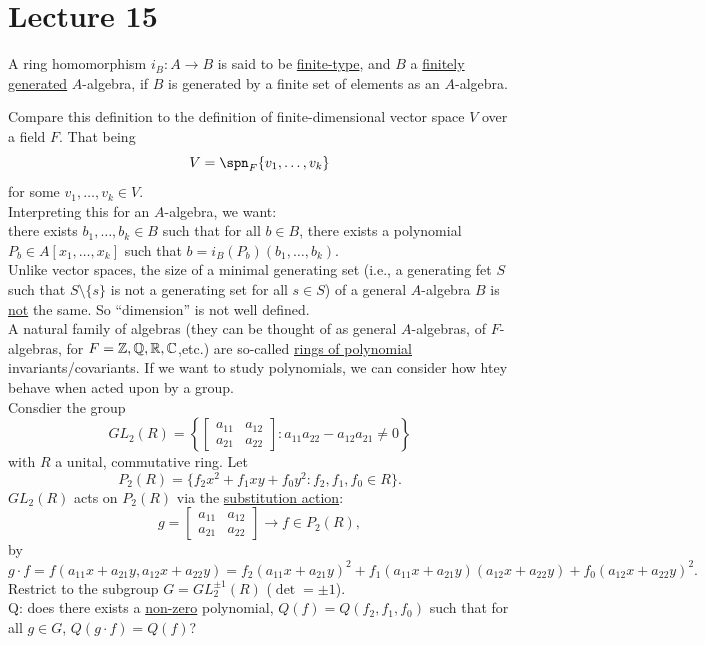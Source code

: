 \documentclass[twoside, openright, fontsize=10pt, headings=big]{scrbook}
\begin{document}
\chapter{Lecture 15}
\begin{definition}{}{}
    A ring homomorphism $i_B:A\to B$ is said to be \underline{finite-type}, and $B$ a \underline{finitely generated} $A$-algebra, if $B$ is generated by a finite set of elements as an $A$-algebra. 
\end{definition}
Compare this definition to the definition of finite-dimensional vector space $V$ over a field $F$. That being
\[
    V=\spn_F\{v_1,\dots,v_k\}
\]
for some $v_1,\dots,v_k\in V$.\\
Interpreting this for an $A$-algebra, we want:\\
there exists $b_1,\dots,b_k\in B$ such that for all $b\in B$, there exists a polynomial $P_b\in A[x_1,\dots,x_k]$ such that $b=i_B(P_b)(b_1,\dots,b_k)$.\\
Unlike vector spaces, the size of a minimal generating set (i.e., a generating fet $S$ such that $S\setminus\{s\}$ is not a generating set for all $s\in S$) of a general $A$-algebra $B$ is \underline{not} the same. So ``dimension'' is not well defined.\\
A natural family of algebras (they can be thought of as general $A$-algebras, of $F$-algebras, for $F=\mathbb{Z},\mathbb{Q},\mathbb{R},\mathbb{C}$,etc.) are so-called \underline{rings of polynomial} invariants/covariants. If we want to study polynomials, we can consider how htey behave when acted upon by a group.\\
Consdier the group
\[
    GL_2(R)=\left\{\begin{bmatrix}
        a_{11}&a_{12}\\a_{21}&a_{22}
    \end{bmatrix}:
    a_{11}a_{22}-a_{12}a_{21}\neq0\right\}
\]
with $R$ a unital, commutative ring. Let 
\[
    P_2(R)=\{f_2x^2+f_1xy+f_0y^2:f_2,f_1,f_0\in R\}.
\]
$GL_2(R)$ acts on $P_2(R)$ via the \underline{substitution action}:
\[
    g=
    \begin{bmatrix}
        a_{11}&a_{12}\\a_{21}&a_{22}
    \end{bmatrix}\to f\in P_2(R),
\]
by 
\[
    g\cdot f=f(a_{11}x+a_{21}y,a_{12}x+a_{22}y)=f_2(a_{11}x+a_{21}y)^2+f_1(a_{11}x+a_{21}y)(a_{12}x+a_{22}y)+f_0(a_{12}x+a_{22}y)^2.
\]
Restrict to the subgroup $G=GL_2^{\pm1}(R)$ ($\det=\pm1$).\\
Q: does there exists a \underline{non-zero} polynomial, $Q(f)=Q(f_2,f_1,f_0)$ such that for all $g\in G$, $Q(g\cdot f)=Q(f)$?\\
\end{document}
